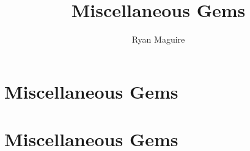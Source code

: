 \documentclass[crop=false,class=book,oneside]{standalone}
\begin{document}
    \newif\ifworkmiscellaneousgems
    \ifx\ifwork\undefined
        \title{Miscellaneous Gems}
        \author{Ryan Maguire}
        \date{\vspace{-5ex}}
        \maketitle
        \tableofcontents
        \clearpage
        \chapter*{Miscellaneous Gems}
        \setcounter{chapter}{1}
    \else
        \chapter{Miscellaneous Gems}
    \fi
\end{document}
